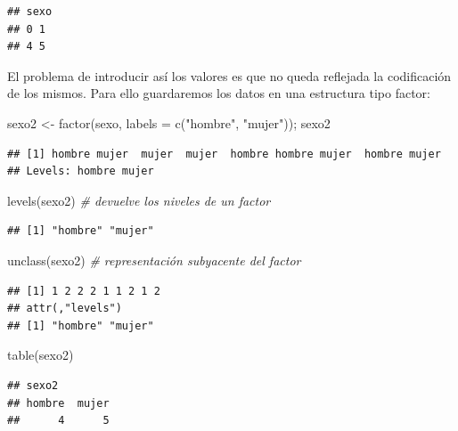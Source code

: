 \documentclass[
]{book}
\newenvironment{Shaded}{\begin{snugshade}}{\end{snugshade}}
\newcommand{\AttributeTok}[1]{\textcolor[rgb]{0.77,0.63,0.00}{#1}}
\newcommand{\CommentTok}[1]{\textcolor[rgb]{0.56,0.35,0.01}{\textit{#1}}}
\newcommand{\FunctionTok}[1]{\textcolor[rgb]{0.00,0.00,0.00}{#1}}
\newcommand{\NormalTok}[1]{#1}
\newcommand{\OtherTok}[1]{\textcolor[rgb]{0.56,0.35,0.01}{#1}}
\newcommand{\StringTok}[1]{\textcolor[rgb]{0.31,0.60,0.02}{#1}}
\theoremstyle{break}
\theoremstyle{nonumberplain}
\begin{document}
\begin{verbatim}
## sexo
## 0 1 
## 4 5
\end{verbatim}

El problema de introducir así los valores es que no queda reflejada la codificación de los mismos.
Para ello guardaremos los datos en una estructura tipo factor:

\begin{Shaded}
\begin{Highlighting}[]
\NormalTok{sexo2 }\OtherTok{\textless{}{-}} \FunctionTok{factor}\NormalTok{(sexo, }\AttributeTok{labels =} \FunctionTok{c}\NormalTok{(}\StringTok{"hombre"}\NormalTok{, }\StringTok{"mujer"}\NormalTok{)); sexo2}
\end{Highlighting}
\end{Shaded}

\begin{verbatim}
## [1] hombre mujer  mujer  mujer  hombre hombre mujer  hombre mujer 
## Levels: hombre mujer
\end{verbatim}

\begin{Shaded}
\begin{Highlighting}[]
\FunctionTok{levels}\NormalTok{(sexo2)  }\CommentTok{\# devuelve los niveles de un factor}
\end{Highlighting}
\end{Shaded}

\begin{verbatim}
## [1] "hombre" "mujer"
\end{verbatim}

\begin{Shaded}
\begin{Highlighting}[]
\FunctionTok{unclass}\NormalTok{(sexo2)  }\CommentTok{\# representación subyacente del factor}
\end{Highlighting}
\end{Shaded}

\begin{verbatim}
## [1] 1 2 2 2 1 1 2 1 2
## attr(,"levels")
## [1] "hombre" "mujer"
\end{verbatim}

\begin{Shaded}
\begin{Highlighting}[]
\FunctionTok{table}\NormalTok{(sexo2)}
\end{Highlighting}
\end{Shaded}

\begin{verbatim}
## sexo2
## hombre  mujer 
##      4      5
\end{verbatim}
\end{document}
